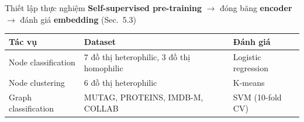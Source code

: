\begin{frame}{Thiết lập thực nghiệm}
  \centering
  \textbf{Self-supervised pre-training} $\rightarrow$ đóng băng \textbf{encoder} $\rightarrow$ đánh giá \textbf{embedding} (Sec.~5.3)\\[1em]
  \renewcommand{\arraystretch}{1.4}
  \begin{tabular}{l l l}
    \toprule
    \textbf{Tác vụ} & \textbf{Dataset} & \textbf{Đánh giá} \\
    \midrule
    Node classification  & 7 đồ thị heterophilic, 3 đồ thị homophilic & Logistic regression \\
    Node clustering      & 6 đồ thị heterophilic                      & K-means \\
    Graph classification & MUTAG, PROTEINS, IMDB-M, COLLAB     & SVM (10-fold CV) \\
    \bottomrule
  \end{tabular}
\end{frame}

